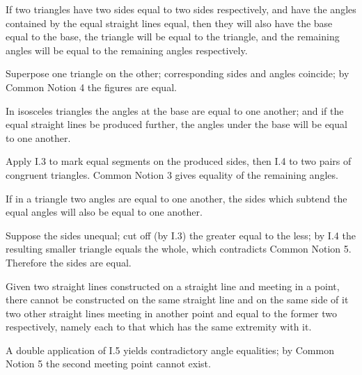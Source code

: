 \documentclass{rrxiv}
\begin{document}
\begin{claim}
\label{prop:I.4}
If two triangles have two sides equal to two sides respectively, and
have the angles contained by the equal straight lines equal, then they
will also have the base equal to the base, the triangle will be equal
to the triangle, and the remaining angles will be equal to the
remaining angles respectively.
\end{claim}
\begin{evidence}[Proof of I.4]
\label{ev:I.4}
Superpose one triangle on the other; corresponding sides and angles
coincide; by Common Notion 4 the figures are equal.
\end{evidence}

\begin{claim}
\label{prop:I.5}
In isosceles triangles the angles at the base are equal to one
another; and if the equal straight lines be produced further, the
angles under the base will be equal to one another.
\end{claim}
\begin{evidence}[Proof of I.5]
\label{ev:I.5}

Apply I.3 to mark equal segments on the produced sides, then I.4 to
two pairs of congruent triangles.  Common Notion 3 gives equality of
the remaining angles.
\end{evidence}

\begin{claim}
\label{prop:I.6}
If in a triangle two angles are equal to one another, the sides which
subtend the equal angles will also be equal to one another.
\end{claim}
\begin{evidence}[Proof of I.6]
\label{ev:I.6}
Suppose the sides unequal; cut off (by I.3) the greater equal to the
less; by I.4 the resulting smaller triangle equals the whole, which
contradicts Common Notion 5.  Therefore the sides are equal.
\end{evidence}

\begin{claim}
\label{prop:I.7}
Given two straight lines constructed on a straight line and meeting in
a point, there cannot be constructed on the same straight line and on
the same side of it two other straight lines meeting in another point
and equal to the former two respectively, namely each to that which
has the same extremity with it.
\end{claim}
\begin{evidence}[Proof of I.7]
\label{ev:I.7}
A double application of I.5 yields contradictory angle equalities; by
Common Notion 5 the second meeting point cannot exist.
\end{evidence}
\end{document}
